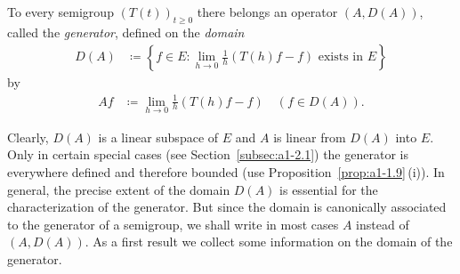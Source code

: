 \begin{definition}\label{def:a1-1.5}
To every semigroup $(T(t))_{t \geq 0}$ there belongs an operator $(A,D(A))$, 
called the \emph{generator}, defined on the \emph{domain}
\begin{align*}
    D(A) &\coloneq \left\{ f \in E \colon \lim_{h\to0} \frac{1}{h} (T(h)f - f)
             \text{ exists in } E \right\}
\end{align*}
by
\begin{align*}
    Af &\coloneq \lim_{h\to0} \frac{1}{h} (T(h)f - f) \quad (f \in D(A)).
\end{align*}
\end{definition}
Clearly, $D(A)$ is a linear subspace of\/ $E$ and $A$ is linear from $D(A)$ into $E$.
Only in certain special cases (see Section~\ref{subsec:a1-2.1}) the generator
is everywhere defined and therefore bounded (use Proposition~\ref{prop:a1-1.9}\,(i)). 
In general, the precise extent of the domain $D(A)$ is essential for the characterization of the generator.
But since the domain is canonically associated to the generator of a semigroup, we shall write in most cases $A$ instead of\/ $(A,D(A))$.
As a first result we collect some information on the domain of the generator.
